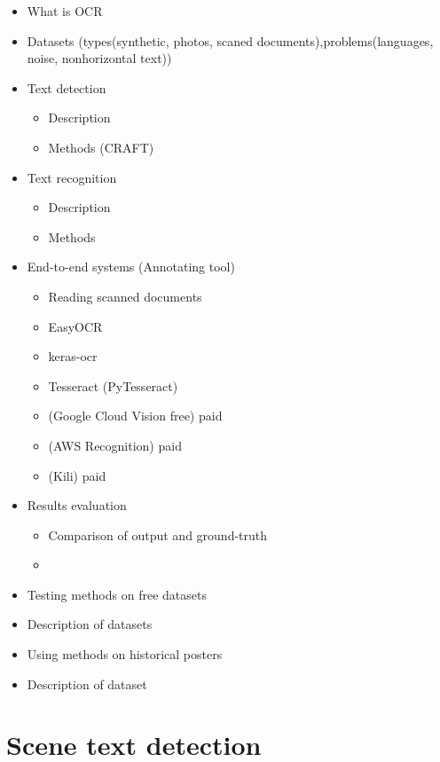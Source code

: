 
\begin{itemize}
    \item What is OCR 
    \item Datasets (types(synthetic, photos, scaned documents),problems(languages, noise, nonhorizontal text))
    \item Text detection
    \begin{itemize}
        \item Description
        \item Methods (CRAFT)
    \end{itemize}
    \item Text recognition
    \begin{itemize}
        \item Description
        \item Methods 
    \end{itemize}
    \item End-to-end systems (Annotating tool)
    \begin{itemize}
        \item[] Reading scanned documents
        \item EasyOCR
        \item keras-ocr
        \item Tesseract (PyTesseract)
        \item (Google Cloud Vision free) paid
        \item (AWS Recognition) paid 
        \item (Kili) paid
    \end{itemize}
    \item Results evaluation
    \begin{itemize}
        \item Comparison of output and ground-truth
        \item 
    \end{itemize}
    \item Testing methods on free datasets
    \item[] Description of datasets
    \item Using methods on historical posters    
    \item[] Description of dataset

\end{itemize}


\section{Scene text detection}

